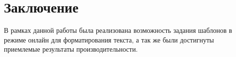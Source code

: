 \section*{Заключение}
В рамках данной работы была реализована возможность задания шаблонов в режиме онлайн для форматирования текста, а так же были достигнуты приемлемые результаты производительности.

